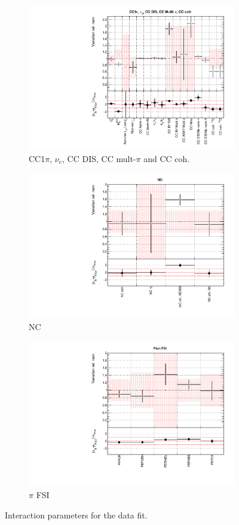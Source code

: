 \begin{figure}[!htbp]
\begin{subfigure}{0.49\textwidth}
  \centering
  \includegraphics[width=0.9\linewidth]{figs/datxsec3}
  \caption{CC1$\pi$, $\nu_e$, CC DIS, CC mult-$\pi$ and CC coh.}
\end{subfigure}
\begin{subfigure}{0.45\textwidth}
  \centering
  \includegraphics[width=0.9\linewidth]{figs/datxsec4}
  \caption{NC}
\end{subfigure}
\begin{subfigure}{0.49\textwidth}
  \centering
  \includegraphics[width=0.9\linewidth]{figs/datxsec5}
  \caption{$\pi$ FSI}
\end{subfigure}
\caption{Interaction parameters for the data fit.}
\label{fig:datxsec}
\end{figure}

